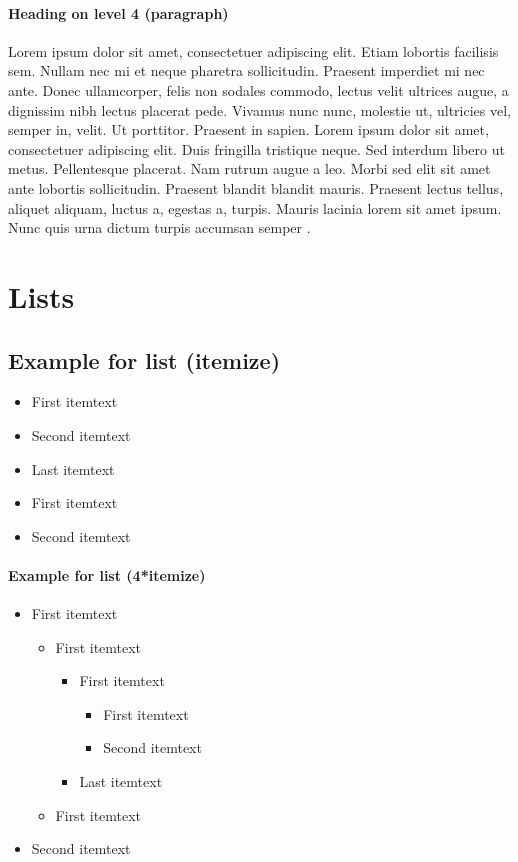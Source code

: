 \paragraph{Heading on level 4 (paragraph)}

Lorem ipsum dolor sit amet, consectetuer adipiscing elit. Etiam lobortis facilisis sem. Nullam nec mi et neque pharetra sollicitudin. Praesent imperdiet mi nec ante. Donec ullamcorper, felis non sodales commodo, lectus velit ultrices augue, a dignissim nibh lectus placerat pede. Vivamus nunc nunc, molestie ut, ultricies vel, semper in, velit. Ut porttitor. Praesent in sapien. Lorem ipsum dolor sit amet, consectetuer adipiscing elit. Duis fringilla tristique neque. Sed interdum libero ut metus. Pellentesque placerat. Nam rutrum augue a leo. Morbi sed elit sit amet ante lobortis sollicitudin. Praesent blandit blandit mauris. Praesent lectus tellus, aliquet aliquam, luctus a, egestas a, turpis. Mauris lacinia lorem sit amet ipsum. Nunc quis urna dictum turpis accumsan semper \cite{example}.

\section{Lists}

\subsection{Example for list (itemize)}

\begin{itemize}
  \item First itemtext
  \item Second itemtext
  \item Last itemtext
  \item First itemtext
  \item Second itemtext
\end{itemize}

\paragraph{Example for list (4*itemize)}

\begin{itemize}
  \item First itemtext
  \begin{itemize}
    \item First itemtext
    \begin{itemize}
      \item First itemtext
      \begin{itemize}
        \item First itemtext
        \item Second itemtext
      \end{itemize}
    \item Last itemtext
    \end{itemize}
  \item First itemtext
  \end{itemize}
  \item Second itemtext
\end{itemize}

